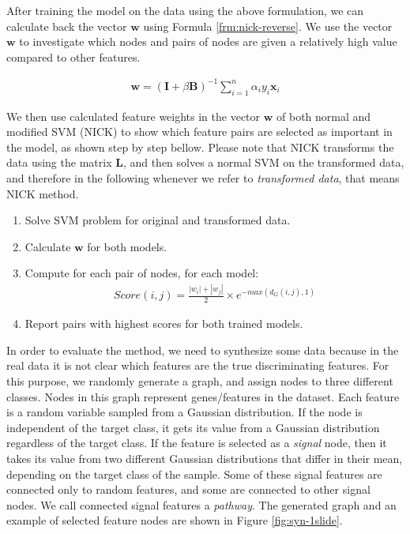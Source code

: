 After training the model on the data using the above formulation, we can calculate back the vector $\mathbf{w}$ using Formula \ref{frm:nick-reverse}. We use the vector $\mathbf{w}$ to investigate which nodes and pairs of nodes are given a relatively high value compared to other features.

\begin{align}
  \mathbf{w} = (\mathbf{I} + \beta \mathbf{B})^{-1} \sum_{i = 1}^n \alpha_i y_i \mathbf{x}_i
  \label{frm:nick-reverse}
\end{align}

We then use calculated feature weights in the vector $\mathbf{w}$ of both normal and modified SVM (NICK) to show which feature pairs are selected as important in the model, as shown step by step bellow. Please note that NICK transforms the data using the matrix $\mathbf{L}$, and then solves a normal SVM on the transformed data, and therefore in the following whenever we refer to \emph{transformed data}, that means NICK method.

\begin{enumerate}
\item Solve SVM problem for original and transformed data.
\item Calculate $\mathbf{w}$ for both models.
\item Compute for each pair of nodes, for each model: \\
  \begin{align}
    Score(i, j) = \frac{|w_i| + |w_j|}{2} \times e^{-max\left(d_G(i, j), 1\right)}
    \label{frm:nick-score}
  \end{align}
\item Report pairs with highest scores for both trained models.
\end{enumerate}

In order to evaluate the method, we need to synthesize some data because in the real data it is not clear which features are the true discriminating features. For this purpose, we randomly generate a graph, and assign nodes to three different classes. Nodes in this graph represent genes/features in the dataset. Each feature is a random variable sampled from a Gaussian distribution. If the node is independent of the target class, it gets its value from a Gaussian distribution regardless of the target class. If the feature is selected as a \emph{signal} node, then it takes its value from two different Gaussian distributions that differ in their mean, depending on the target class of the sample. Some of these signal features are connected only to random features, and some are connected to other signal nodes. We call connected signal features a \emph{pathway}. The generated graph and an example of selected feature nodes are shown in Figure \ref{fig:syn-1slide}.

